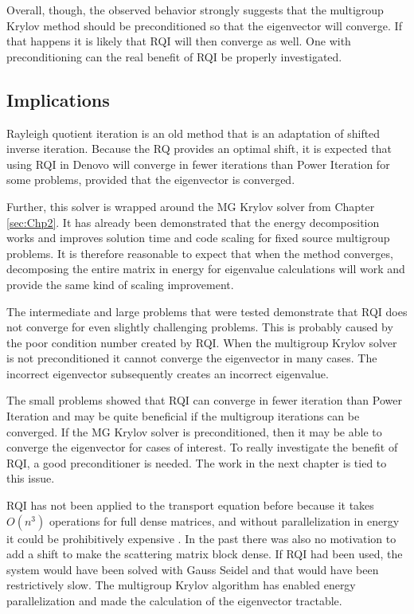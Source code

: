 Overall, though, the observed behavior strongly suggests that the multigroup Krylov method should be preconditioned so that the eigenvector will converge. If that happens it is likely that RQI will then converge as well. One with preconditioning can the real benefit of RQI be properly investigated.

\subsection{Implications}
Rayleigh quotient iteration is an old method that is an adaptation of shifted inverse iteration. Because the RQ provides an optimal shift, it is expected that using RQI in Denovo will converge in fewer iterations than Power Iteration for some problems, provided that the eigenvector is converged. 

Further, this solver is wrapped around the MG Krylov solver from Chapter \ref{sec:Chp2}. It has already been demonstrated that the energy decomposition works and improves solution time and code scaling for fixed source multigroup problems. It is therefore reasonable to expect that when the method converges, decomposing the entire matrix in energy for eigenvalue calculations will work and provide the same kind of scaling improvement.

The intermediate and large problems that were tested demonstrate that RQI does not converge for even slightly challenging problems. This is probably caused by the poor condition number created by RQI. When the multigroup Krylov solver is not preconditioned it cannot converge the eigenvector in many cases. The incorrect eigenvector subsequently creates an incorrect eigenvalue. 

The small problems showed that RQI can converge in fewer iteration than Power Iteration and may be quite beneficial if the multigroup iterations can be converged. If the MG Krylov solver is preconditioned, then it may be able to converge the eigenvector for cases of interest. To really investigate the benefit of RQI, a good preconditioner is needed. The work in the next chapter is tied to this issue.

RQI has not been applied to the transport equation before because it takes $O(n^{3})$ operations for full dense matrices, and without parallelization in energy it could be prohibitively expensive \cite{Stewart2001}. In the past there was also no motivation to add a shift to make the scattering matrix block dense. If RQI had been used, the system would have been solved with Gauss Seidel and that would have been restrictively slow. The multigroup Krylov algorithm has enabled energy parallelization and made the calculation of the eigenvector tractable. 

